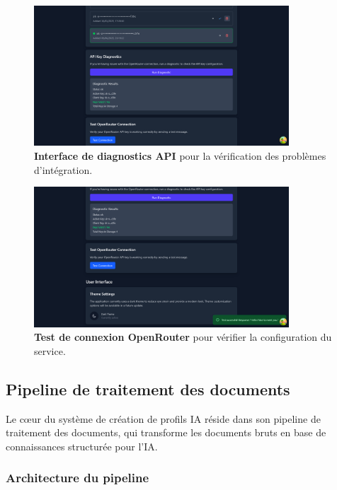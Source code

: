 \begin{figure}[H]
  \centering
  \includegraphics[width=0.85\textwidth,keepaspectratio]{pfe-pics/ai-profile-creation/api_diagnostics.png}
  \caption{\textbf{Interface de diagnostics API} pour la vérification des problèmes d'intégration.}
  \label{fig:api_diagnostics}
\end{figure}

\begin{figure}[H]
  \centering
  \includegraphics[width=0.85\textwidth,keepaspectratio]{pfe-pics/ai-profile-creation/test_openRouter_connection.png}
  \caption{\textbf{Test de connexion OpenRouter} pour vérifier la configuration du service.}
  \label{fig:openrouter_test}
\end{figure}

\subsection{Pipeline de traitement des documents}

Le cœur du système de création de profils IA réside dans son pipeline de traitement des documents, qui transforme les documents bruts en base de connaissances structurée pour l'IA.

\subsubsection{Architecture du pipeline}

